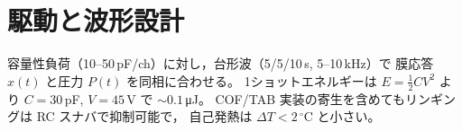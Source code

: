 \section{駆動と波形設計}
容量性負荷（10–50\,pF/ch）に対し，台形波（5/5/10\,\textmu s, 5–10\,kHz）で
膜応答 $x(t)$ と圧力 $P(t)$ を同相に合わせる。
1ショットエネルギーは $E=\tfrac12 C V^2$ より
$C=30$\,pF, $V=45$\,V で $\sim0.1$\,\si{\micro J}。
COF/TAB 実装の寄生を含めてもリンギングは RC スナバで抑制可能で，
自己発熱は $\Delta T<2\,^\circ$C と小さい。
